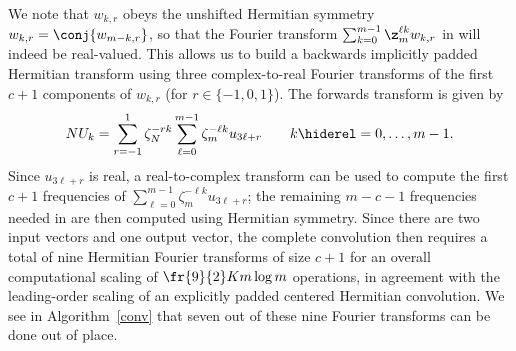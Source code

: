 \documentclass[final]{siamltex}
\def\belc{\begin{equation}}
\def\eelc{\end{equation}}
\def\no{\hiderel}
\begin{document}
We note that $w_{k,r}$ obeys the unshifted Hermitian symmetry 
$w_{k,r}=\conj{w_{m-k,r}}$, so that the Fourier transform
$\sum_{k=0}^{m-1}\z_m^{\ell k} w_{k,r}$ in  will indeed
be real-valued. This allows us to build a backwards implicitly padded
Hermitian transform using three complex-to-real Fourier transforms of the
first $c+1$ components of $w_{k,r}$ (for $r\in\{-1,0,1\}$). The forwards
transform is given 
by
\belc
NU_k
=\sum_{r=-1}^{1}\zeta_N^{-rk}\sum_{\ell=0}^{m-1}\zeta_m^{-\ell k} u_{3\ell+r}
\qquad k\no =0,\ldots,m-1.\label{fft0forwardsB}
\eelc
Since $u_{3\ell+r}$ is real, a real-to-complex transform can be used to
compute the first $c+1$ frequencies of
$\sum_{\ell=0}^{m-1}\zeta_m^{-\ell k} u_{3\ell+r}$; the remaining $m-c-1$
frequencies needed in  are then computed using Hermitian
symmetry. Since there are two input vectors and
one output vector, the complete convolution then requires a total of nine
Hermitian Fourier transforms of size $c+1$ for an overall computational
scaling of $\fr{9}{2}K m \log m$ operations, in agreement with the
leading-order scaling of an explicitly padded centered Hermitian convolution.
We see in Algorithm~\ref{conv} that seven out of these nine Fourier
transforms can be done out of place.

\end{document}
